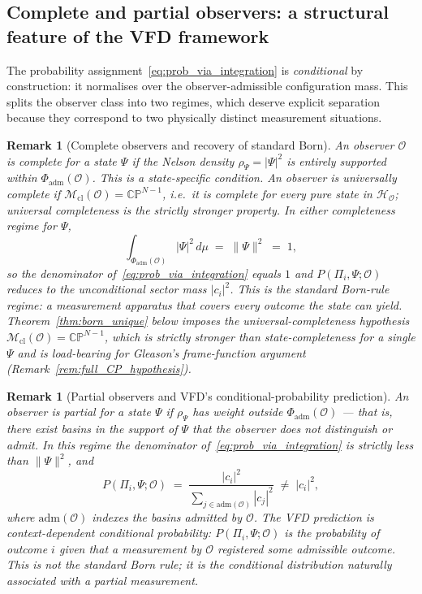 \documentclass[12pt]{article}
\newtheorem{remark}[theorem]{Remark}
\newcommand{\Ocal}{\mathcal{O}}
\newcommand{\Hcal}{\mathcal{H}}
\newcommand{\Mcl}{\mathcal{M}_{\mathrm{cl}}}
\begin{document}
\subsection{Complete and partial observers: a structural feature of the VFD framework}\label{subsec:complete_partial}

The probability assignment~\eqref{eq:prob_via_integration} is \emph{conditional} by construction: it normalises over the observer-admissible configuration mass. This splits the observer class into two regimes, which deserve explicit separation because they correspond to two physically distinct measurement situations.

\begin{remark}[Complete observers and recovery of standard Born]\label{rem:complete_partial}
An observer $\Ocal$ is \emph{complete for a state $\Psi$} if the Nelson density $\rho_\Psi = |\Psi|^2$ is entirely supported within $\Phi_{\mathrm{adm}}(\Ocal)$. This is a state-specific condition. An observer is \emph{universally complete} if $\Mcl(\Ocal) = \mathbb{CP}^{N-1}$, i.e.\ it is complete for every pure state in $\Hcal_\Ocal$; universal completeness is the strictly stronger property. In either completeness regime for $\Psi$,
\begin{equation}\label{eq:complete_observer}
    \int_{\Phi_{\mathrm{adm}}(\Ocal)} |\Psi|^2\, d\mu \;=\; \|\Psi\|^2 \;=\; 1,
\end{equation}
so the denominator of~\eqref{eq:prob_via_integration} equals $1$ and $P(\Pi_i, \Psi; \Ocal)$ reduces to the unconditional sector mass $|c_i|^2$. This is the standard Born-rule regime: a measurement apparatus that covers every outcome the state can yield. Theorem~\ref{thm:born_unique} below imposes the universal-completeness hypothesis $\Mcl(\Ocal) = \mathbb{CP}^{N-1}$, which is strictly stronger than state-completeness for a single $\Psi$ and is load-bearing for Gleason's frame-function argument (Remark~\ref{rem:full_CP_hypothesis}).
\end{remark}

\begin{remark}[Partial observers and VFD's conditional-probability prediction]\label{rem:partial}
An observer is \emph{partial} for a state $\Psi$ if $\rho_\Psi$ has weight outside $\Phi_{\mathrm{adm}}(\Ocal)$ --- that is, there exist basins in the support of $\Psi$ that the observer does not distinguish or admit. In this regime the denominator of~\eqref{eq:prob_via_integration} is strictly less than $\|\Psi\|^2$, and
\begin{equation}\label{eq:partial_observer}
    P(\Pi_i, \Psi; \Ocal) \;=\; \frac{|c_i|^2}{\sum_{j \in \mathrm{adm}(\Ocal)} |c_j|^2} \;\neq\; |c_i|^2,
\end{equation}
where $\mathrm{adm}(\Ocal)$ indexes the basins admitted by $\Ocal$. The VFD prediction is context-dependent conditional probability: $P(\Pi_i, \Psi; \Ocal)$ is the probability of outcome $i$ given that a measurement by $\Ocal$ registered some admissible outcome. This is not the standard Born rule; it is the conditional distribution naturally associated with a partial measurement.
\end{remark}
\end{document}

